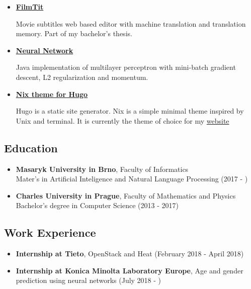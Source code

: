\documentclass[a4,12pt]{article}
\begin{document}
\begin{itemize}
\item
  \textbf{\href{https://www.github.com/LordMathis/FilmTit}{FilmTit}}

  Movie subtitles web based editor with machine translation and
  translation memory. Part of my bachelor's thesis.
  
\item
    \textbf{\href{https://github.com/LordMathis/ArtificialNeuralNetwork}{Neural Network}}

    Java implementation of multilayer perceptron with mini-batch gradient descent, L2 regularization and momentum.
  
\item
  \textbf{\href{https://www.github.com/LordMathis/hugo-theme-nix}{Nix theme
  for Hugo}}

  Hugo is a static site generator. Nix is a simple minimal theme
  inspired by Unix and terminal. It is currently the theme of choice for
  my \href{https://namesny.com}{website}

\end{itemize}

\subsection*{Education}\label{education}

\begin{itemize}
\item
  \textbf{Masaryk University in Brno}, Faculty of Informatics\\
  Mater's in Artificial Inteligence and Natural Language Processing (2017 - )
\item
  \textbf{Charles University in Prague}, Faculty of Mathematics and
  Physics\\
  Bachelor's degree in Computer Science (2013 - 2017)
\end{itemize}

\subsection*{Work Experience}\label{work}

\begin{itemize}
\item
  \textbf{Internship at Tieto}, OpenStack and Heat (February 2018 - April 2018)
\item
  \textbf{Internship at Konica Minolta Laboratory Europe}, Age and gender prediction using neural networks (July 2018 - )
\end{itemize}
\end{document}
